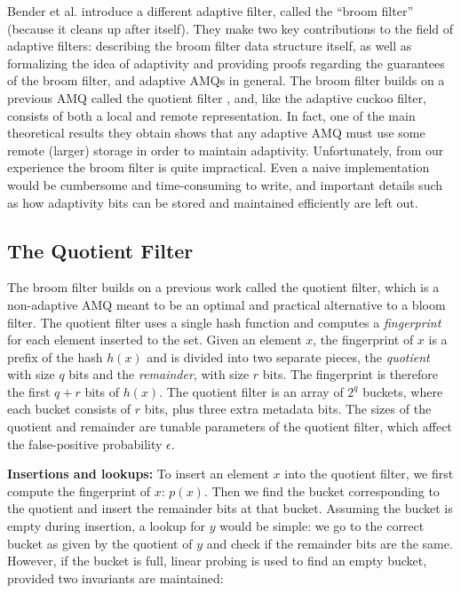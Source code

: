 \documentclass[../paper.tex]{subfiles}
\begin{document}
 Bender et al. \cite{broom-filter} introduce a different adaptive filter, called the ``broom filter''
(because it cleans up after itself). They make two key contributions to the
field of adaptive filters: describing the broom filter data structure itself,
as well as formalizing the idea of adaptivity and providing proofs regarding the guarantees
of the broom filter, and adaptive AMQs in general. The broom filter builds on
a previous AMQ called the quotient filter \cite{quotient-filter}, and, like the adaptive
cuckoo filter, consists of both a local and remote representation. In fact, one
of the main theoretical results they obtain shows that any adaptive AMQ must use
some remote (larger) storage in order to maintain adaptivity. Unfortunately, from
our experience the broom filter is quite impractical. Even a naive implementation
would be cumbersome and time-consuming to write, and important details such as
how adaptivity bits can be stored and maintained efficiently are left out.

\subsection{The Quotient Filter}

The broom filter builds on a previous work called the quotient filter, which
is a non-adaptive AMQ meant to be an optimal and practical alternative to a bloom filter.
The quotient filter uses a single hash function and computes a \textit{fingerprint} for
each element inserted to the set. Given an element $x$, the fingerprint of $x$ is a
prefix of the hash $h(x)$ and is divided into two separate pieces, the \textit{quotient} with
size $q$ bits and the \textit{remainder}, with size $r$ bits. The fingerprint is therefore
the first $q+r$ bits of $h(x)$.
The quotient filter is an array of $2^q$ buckets, where
each bucket consists of $r$ bits, plus three extra metadata bits.
The sizes of the quotient and remainder are tunable
parameters of the quotient filter, which affect the false-positive probability $\epsilon$.

\textbf{Insertions and lookups:} To insert an element $x$ into the quotient filter, we first
compute the fingerprint of $x$: $p(x)$. Then we find the bucket corresponding
to the quotient and insert the remainder bits at that bucket. Assuming the bucket
is empty during insertion, a lookup for $y$ would be simple: we go to the correct bucket as given
by the quotient of $y$ and check if the remainder bits are the same. However, if the bucket is
full, linear probing is used to find an empty bucket, provided two invariants are maintained:
\end{document}
